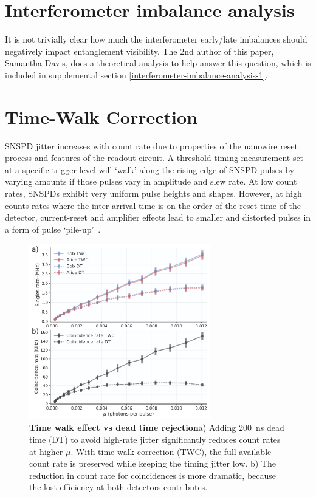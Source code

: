 \documentclass[11pt]{caltech_thesis} %
\begin{document}
\hypertarget{interferometer-imbalance-analysis}{%
\section{Interferometer imbalance analysis}\label{interferometer-imbalance-analysis}}

It is not trivially clear how much the interferometer early/late imbalances should negatively impact entanglement visibility. The 2nd author of this paper, Samantha Davis, does a theoretical analysis to help answer this question, which is included in supplemental section \ref{interferometer-imbalance-analysis-1}.

\hypertarget{time-walk-correction}{%
\section{Time-Walk Correction}\label{time-walk-correction}}

SNSPD jitter increases with count rate due to properties of the nanowire reset process and features of the readout circuit. A threshold timing measurement set at a specific trigger level will `walk' along the rising edge of SNSPD pulses by varying amounts if those pulses vary in amplitude and slew rate. At low count rates, SNSPDs exhibit very uniform pulse heights and shapes. However, at high counts rates where the inter-arrival time is on the order of the reset time of the detector, current-reset and amplifier effects lead to smaller and distorted pulses in a form of pulse `pile-up'~\autocite{Mueller2023}.

\hypertarget{fig:time_walk_vs_dead_time}{%
\begin{figure}
\centering
\includegraphics[width=0.7\textwidth,height=\textheight]{./chapter_05/figs/time_walk_comparison_light.pdf}
\caption[{sTime walk effect vs dead time rejection}]{\textbf{Time walk effect vs dead time rejection}a) Adding 200~ns dead time (DT) to avoid high-rate jitter significantly reduces count rates at higher $\mu$. With time walk correction (TWC), the full available count rate is preserved while keeping the timing jitter low. b) The reduction in count rate for coincidences is more dramatic, because the lost efficiency at both detectors contributes.}
\label{fig:time_walk_vs_dead_time}
\end{figure}
}
\end{document}
